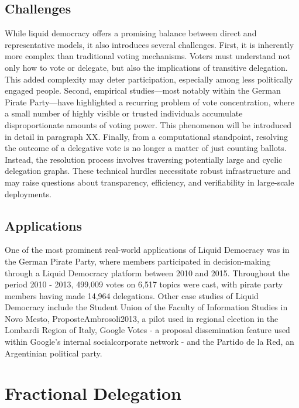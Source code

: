 \subsection{Challenges}

While liquid democracy offers a promising balance between direct and representative models, it also introduces several challenges. First, it is inherently more complex than traditional voting mechanisms. Voters must understand not only how to vote or delegate, but also the implications of transitive delegation. This added complexity may deter participation, especially among less politically engaged people. Second, empirical studies—most notably within the German Pirate Party—have highlighted a recurring problem of vote concentration, where a small number of highly visible or trusted individuals accumulate disproportionate amounts of voting power. This phenomenon will be introduced in detail in paragraph XX. Finally, from a computational standpoint, resolving the outcome of a delegative vote is no longer a matter of just counting ballots. Instead, the resolution process involves traversing potentially large and cyclic delegation graphs. These technical hurdles necessitate robust infrastructure and may raise questions about transparency, efficiency, and verifiability in large-scale deployments.

\subsection{Applications}

One of the most prominent real-world applications of Liquid Democracy was in the German Pirate Party, where members participated in decision-making through a Liquid Democracy platform between 2010 and 2015. \cite{paulinOverviewTenYears2020} Throughout the period 2010 - 2013, 499,009 votes on 6,517 topics were cast, with pirate party members having made 14,964 delegations. \cite{klingVotingBehaviourPower2015} Other case studies of Liquid Democracy include the Student Union of the Faculty of Information Studies in Novo Mesto, ProposteAmbrosoli2013, a pilot used in regional election in the Lombardi Region of Italy, Google Votes - a proposal dissemination feature used within Google’s internal socialcorporate network - and the Partido de la Red, an Argentinian political party. \cite{paulinOverviewTenYears2020}

\section{Fractional Delegation}

